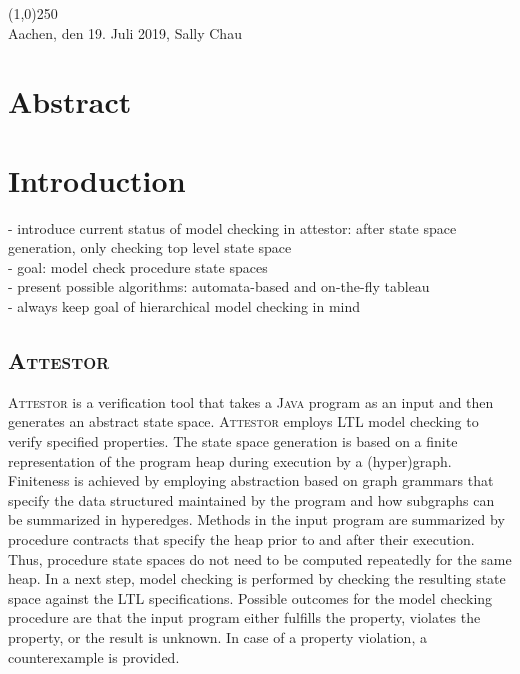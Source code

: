 \documentclass[a4paper, 12pt, twoside]{report}
\begin{document}
	\noindent\line(1,0){250}\\
	Aachen, den 19. Juli 2019, Sally Chau
	
	\clearpage\mbox{}\clearpage
	
	\chapter*{Abstract}
	
	\clearpage\mbox{}\clearpage
	
	\doublespacing
	\tableofcontents
	\singlespacing
	\clearpage\mbox{}\clearpage
	\thispagestyle{empty} 
	
	\pagestyle{fancy}
	\fancyhead[RE]{\nouppercase\leftmark}
	\fancyhead[LO]{\nouppercase\rightmark}
	\fancyhead[LE,RO]{\thepage}
	\cfoot{}
	
	
	\chapter{Introduction}
	- introduce current status of model checking in attestor: after state space generation, only checking top level state space\\
	- goal: model check procedure state spaces \\
	- present possible algorithms: automata-based and on-the-fly tableau\\
	- always keep goal of hierarchical model checking in mind
	
	
	\section{\textsc{Attestor}}\label{sec:attestor}
	
	
	\textsc{Attestor} is a verification tool that takes a \textsc{Java} program as an input and then generates an abstract state space. \textsc{Attestor} employs LTL model checking to verify specified properties. The state space generation is based on a finite representation of the program heap during execution by a (hyper)graph. Finiteness is achieved by employing abstraction based on graph grammars that specify the data structured maintained by the program and how subgraphs can be summarized in hyperedges. Methods in the input program are summarized by procedure contracts that specify the heap prior to and after their execution. Thus, procedure state spaces do not need to be computed repeatedly for the same heap. In a next step, model checking is performed by checking the resulting state space against the LTL specifications. Possible outcomes for the model checking procedure are that the input program either fulfills the property, violates the property, or the result is unknown. In case of a property violation, a counterexample is provided.\\
	
\end{document}
